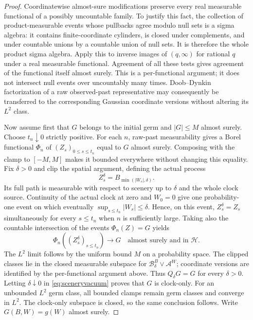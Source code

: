 \documentclass[11pt]{article}
\theoremstyle{remark}\newtheorem{remark}[theorem]{Remark}
\newcommand{\HH}{\mathcal H}
\begin{document}
\begin{proof}
Coordinatewise almost-sure modifications preserve every real
measurable functional of a possibly uncountable family. To justify
this fact, the collection of product-measurable events whose
pullbacks agree modulo null sets is a sigma algebra: it contains
finite-coordinate cylinders, is closed under complements, and
under countable unions by a countable union of null sets. It is
therefore the whole product sigma algebra. Apply this to inverse
images of $(q,\infty)$ for rational $q$ under a real measurable
functional. Agreement of all these tests gives agreement of the
functional itself almost surely. This is a per-functional argument;
it does not intersect null events over uncountably many times.
Doob--Dynkin factorization of a raw observed-past representative
may consequently be transferred to the corresponding Gaussian
coordinate versions without altering its $L^2$ class.

Now assume first that $G$ belongs to the initial germ and
$|G|\leq M$ almost surely. Choose $t_n\downarrow0$ strictly
positive. For each $n$, raw-past measurability gives a Borel
functional $\Phi_n$ of $(Z_s)_{0\leq s\leq t_n}$ equal to $G$
almost surely. Composing with the clamp to $[-M,M]$ makes it
bounded everywhere without changing this equality. Fix $\delta>0$
and clip the spatial argument, defining the actual process
\[
 Z_s^\delta=B_{\min(|W_s|,\delta)}.
\]
Its full path is measurable with respect to scenery up to $\delta$
and the whole clock source. Continuity of the actual clock at zero
and $W_0=0$ give one probability-one event on which eventually
$\sup_{s\leq t_n}|W_s|\leq\delta$. Hence, on this event,
$Z_s^\delta=Z_s$ simultaneously for every $s\leq t_n$ when $n$
is sufficiently large. Taking also the countable intersection of
the events $\Phi_n(Z)=G$ yields
\[
 \Phi_n((Z_s^\delta)_{s\leq t_n})\longrightarrow G
                        \quad\text{almost surely and in }\HH.
\]
The $L^2$ limit follows by the uniform bound $M$ on a probability
space. The clipped classes lie in the closed measurable subspace
for $\mathcal B_\delta^B\vee\mathcal A^W$; coordinate versions
are identified by the per-functional argument above. Thus
$Q_\delta G=G$ for every $\delta>0$. Letting $\delta\downarrow0$
in \eqref{eq:sceneryvacuum} proves that $G$ is clock-only.
For an unbounded $L^2$ germ class, all bounded clamps remain germ
classes and converge in $L^2$. The clock-only subspace is closed,
so the same conclusion follows. Write $G(B,W)=g(W)$ almost surely.


\end{proof}
\end{document}
